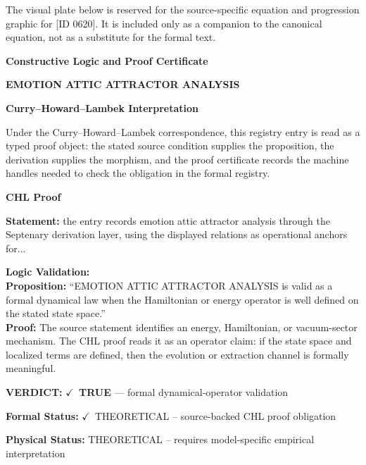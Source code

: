 \begingroup\footnotesize\sloppy
The visual plate below is reserved for the source-specific equation and progression graphic for [ID 0620]. It is included only as a companion to the canonical equation, not as a substitute for the formal text.
\par\endgroup
\ifTZPDarkEdition
{}
\fi

\clearpage
\begingroup\tzpsupportsetup
\noindent\textbf{\fontsize{10.8pt}{12.8pt}\selectfont [ID 0620] Constructive Logic and Proof Certificate}\par
\noindent\textbf{\fontsize{10pt}{12pt}\selectfont EMOTION ATTIC ATTRACTOR ANALYSIS}\par
\vspace{0.45em}
\begingroup
\footnotesize
\setlength{\parskip}{0.22em}
\setlength{\parindent}{0pt}
\noindent\textbf{Curry--Howard--Lambek Interpretation}\par
Under the Curry--Howard--Lambek correspondence, this registry entry is read as a typed proof
object: the stated source condition supplies the proposition, the derivation supplies the
morphism, and the proof certificate records the machine handles needed to check the obligation
in the formal registry.

\vspace{0.45em}
\noindent\textbf{CHL Proof}\par
\textbf{Statement:} the entry records emotion attic attractor analysis through the Septenary derivation
layer, using the displayed relations as operational anchors for...

\textbf{Logic Validation:}\\
\textbf{Proposition:} ``EMOTION ATTIC ATTRACTOR ANALYSIS is valid as a formal dynamical law when the Hamiltonian
or energy operator is well defined on the stated state space.''\\
\textbf{Proof:} The source statement identifies an energy, Hamiltonian, or vacuum-sector mechanism. The
CHL proof reads it as an operator claim: if the state space and localized terms are
defined, then the evolution or extraction channel is formally meaningful.

\textbf{VERDICT:} \ensuremath{\checkmark}\ \textbf{TRUE} --- formal dynamical-operator validation

\textbf{Formal Status:} \ensuremath{\checkmark}\ THEORETICAL -- source-backed CHL proof obligation

\textbf{Physical Status:} THEORETICAL -- requires model-specific empirical interpretation
\par\vspace{0.45em}
\par
\ifTZPDarkEdition
{}
\fi
\endgroup
\endgroup
